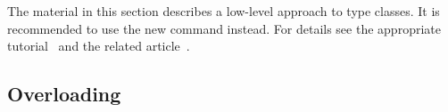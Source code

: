 \begin{warn}
The material in this section describes a low-level approach to type classes.
It is recommended to use the new  command instead.
For details see the appropriate tutorial~\cite{isabelle-classes} and the
related article~\cite{Haftmann-Wenzel:2006:classes}.
\end{warn}


\subsection{Overloading}
\label{sec:overloading}











